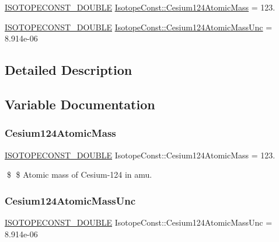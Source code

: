 \begin{DoxyCompactItemize}
\item 
\mbox{\hyperlink{group___isotope_const-_macros_ga8f45a7272ce02c0b4c65c44636ed719a}{I\+S\+O\+T\+O\+P\+E\+C\+O\+N\+S\+T\+\_\+\+D\+O\+U\+B\+LE}} \mbox{\hyperlink{group___isotope_const-_cesium-_cs124_gab470f9552d403363f3bcbaab90b68e83}{Isotope\+Const\+::\+Cesium124\+Atomic\+Mass}} = 123.
\item 
\mbox{\hyperlink{group___isotope_const-_macros_ga8f45a7272ce02c0b4c65c44636ed719a}{I\+S\+O\+T\+O\+P\+E\+C\+O\+N\+S\+T\+\_\+\+D\+O\+U\+B\+LE}} \mbox{\hyperlink{group___isotope_const-_cesium-_cs124_ga03ec68fcb41e1add82e988941355bf92}{Isotope\+Const\+::\+Cesium124\+Atomic\+Mass\+Unc}} = 8.\+914e-\/06
\end{DoxyCompactItemize}


\subsection{Detailed Description}


\subsection{Variable Documentation}
\mbox{\label{group___isotope_const-_cesium-_cs124_gab470f9552d403363f3bcbaab90b68e83}} 
\subsubsection{\texorpdfstring{Cesium124\+Atomic\+Mass}{Cesium124AtomicMass}}
{\footnotesize\ttfamily \mbox{\hyperlink{group___isotope_const-_macros_ga8f45a7272ce02c0b4c65c44636ed719a}{I\+S\+O\+T\+O\+P\+E\+C\+O\+N\+S\+T\+\_\+\+D\+O\+U\+B\+LE}} Isotope\+Const\+::\+Cesium124\+Atomic\+Mass = 123.}

\$ \$ Atomic mass of Cesium-\/124 in amu. \mbox{\label{group___isotope_const-_cesium-_cs124_ga03ec68fcb41e1add82e988941355bf92}} 
\subsubsection{\texorpdfstring{Cesium124\+Atomic\+Mass\+Unc}{Cesium124AtomicMassUnc}}
{\footnotesize\ttfamily \mbox{\hyperlink{group___isotope_const-_macros_ga8f45a7272ce02c0b4c65c44636ed719a}{I\+S\+O\+T\+O\+P\+E\+C\+O\+N\+S\+T\+\_\+\+D\+O\+U\+B\+LE}} Isotope\+Const\+::\+Cesium124\+Atomic\+Mass\+Unc = 8.\+914e-\/06}

